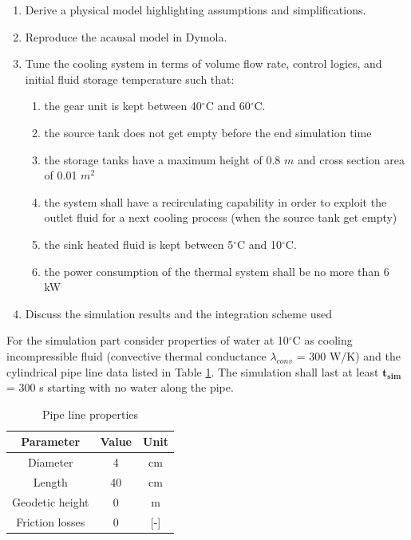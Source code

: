 \documentclass[11pt,a4paper,oneside]{article}
\begin{document}
\begin{enumerate}
    \item Derive a physical model highlighting assumptions and simplifications.
    \item Reproduce the acausal model in Dymola.
    \item Tune the cooling system in terms of volume flow rate, control logics, and initial fluid storage temperature such that:
    \begin{enumerate}
        \item the gear unit is kept between 40$^{\circ}$C and 60$^{\circ}$C.
        \item the source tank does not get empty before the end simulation time
        \item the storage tanks have a maximum height of 0.8 $m$ and cross section area of 0.01 $m^2$
        \item the system shall have a recirculating capability in order to exploit the outlet fluid for a next cooling process (when the source tank get empty)
        \item the sink heated fluid is kept between 5$^{\circ}$C and 10$^{\circ}$C.
        \item the power consumption of the thermal system shall be no more than 6 kW 
    \end{enumerate}
    \item Discuss the simulation results and the integration scheme used
\end{enumerate}

For the simulation part consider properties of water at 10$^{\circ}$C as cooling incompressible fluid (convective thermal conductance $\lambda_{conv}$ = 300 W/K) and the cylindrical pipe line data listed in Table \ref{tab:pipe}.
The simulation shall last at least $\mathbf{t_{sim}}$ = 300 s starting with no water along the pipe.

\begin{table}[ht!]
    \centering
    \caption{Pipe line properties}
    \begin{tabular}{ |c|c|c| } 
        \hline
        \textbf{Parameter} & \textbf{Value} & \textbf{Unit}\\
        \hline
        Diameter & 4 & cm  \\ 
        Length & 40 & cm  \\ 
        Geodetic height & 0 & m \\
        Friction losses & 0 & [-] \\ 
        \hline
    \end{tabular}
    \label{tab:pipe}
\end{table}
\end{document}
